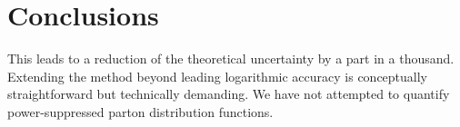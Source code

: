 \section{Conclusions}\label{sec:conclusions}

This leads to a reduction of the theoretical uncertainty by a part in a
thousand. Extending the method beyond leading logarithmic accuracy is
conceptually straightforward but technically demanding. We have not
attempted to quantify power-suppressed parton distribution functions.

